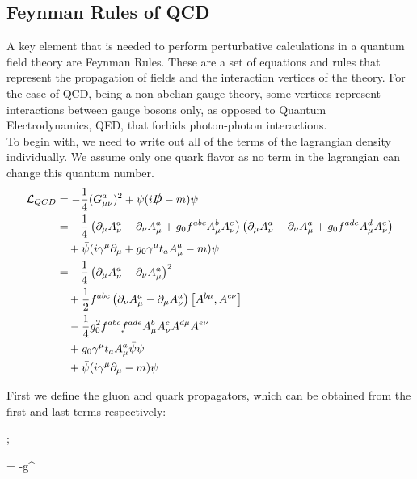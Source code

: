 \subsection{Feynman Rules of QCD}
A key element that is needed to perform perturbative calculations in a quantum field theory are Feynman Rules. These are a set of equations and rules that represent the propagation of fields and the interaction vertices of the theory. For the case of QCD, being a non-abelian gauge theory, some vertices represent interactions between gauge bosons only, as opposed to Quantum Electrodynamics, QED, that forbids photon-photon interactions. \\
To begin with, we need to write out all of the terms of the lagrangian density individually. We assume only one quark flavor as no term in the lagrangian can change this quantum number.
\begin{align}\nonumber
    \mathcal{L}_{QCD} &= -\frac{1}{4}(G_{\mu\nu}^a)^2 +\bar{\psi}(i\slashed{D} - m)\psi \\\nonumber
    &= -\frac{1}{4}\left( \partial_\mu A_\nu^a - \partial_\nu A_\mu^a + g_0f^{abc}A_\mu^b A_\nu^c \right) \left(\partial_\mu A_\nu^a - \partial_\nu A_\mu^a + g_0f^{ade}A_\mu^d A_\nu^e \right) \\\nonumber
    &~~~+ \bar{\psi}(i\gamma^\mu \partial_\mu  + g_0\gamma^\mu t_aA_\mu^a - m)\psi \\\nonumber
    &= -\frac{1}{4}\left(\partial_\mu A_\nu^a - \partial_\nu A_\mu^a\right)^2 \\\nonumber
    &~~~+ \frac{1}{2}f^{abc}\left(\partial_\nu A^a_\mu - \partial_\mu A^a_\nu \right)\left[ A^{b\mu}, A^{c\nu} \right] \\
    &~~~-\frac{1}{4}g_0^2f^{abc}f^{ade}A_\mu^bA_\nu^cA^{d\mu}A^{e\nu} \label{lagr:expanded}  \\\nonumber
    &~~~+g_0\gamma^\mu t_a A_\mu^a \bar{\psi}\psi \\\nonumber
    &~~~+ \bar{\psi}(i\gamma^\mu\partial_\mu - m)\psi
\end{align}

First we define the gluon and quark propagators, which can be obtained from the first and last terms respectively:

\begin{minipage}{0.4\textwidth}
\begin{center}
    ; 
\end{center}
\end{minipage}
\begin{minipage}{0.58\textwidth}
        \beq \nonumber = -g^{\mu\nu} ~~~~~~~~~~~~~~~~~~~~~~~~~~~\eeq
\end{minipage}


